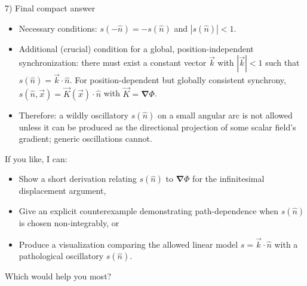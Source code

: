 \documentclass[a4paper]{article}
\theoremstyle{plain}
\theoremstyle{definition}
\newcommand{\vect}[1]{\vec{#1}}
\newcommand{\hatvec}[1]{\hat{#1}}
\newcommand{\del}{\bm{\nabla}}
\begin{document}
7) Final compact answer

\begin{itemize}
\item Necessary conditions: $s(-\hatvec{n}) = -s(\hatvec{n})$ and
  $|s(\hatvec{n})| < 1$.
\item Additional (crucial) condition for a global,
  position-independent synchronization: there must exist a constant
  vector $\vect{k}$ with $|\vect{k}| < 1$ such that
  $s(\hatvec{n}) = \vect{k} \cdot \hatvec{n}$.  For position-dependent
  but globally consistent synchrony,
  $s(\hatvec{n}, \vect{x}) = \vect{K}(\vect{x}) \cdot \hatvec{n}$
  with $\vect{K} = \del \Phi$.
\item Therefore: a wildly oscillatory $s(\hatvec{n})$ on a small
  angular arc is not allowed unless it can be produced as the
  directional projection of some scalar field's gradient; generic
  oscillations cannot.
\end{itemize}

If you like, I can:
\begin{itemize}
\item Show a short derivation relating $s(\hatvec{n})$ to $\del \Phi$
  for the infinitesimal displacement argument,
\item Give an explicit counterexample demonstrating path-dependence
  when $s(\hatvec{n})$ is chosen non-integrably, or
\item Produce a visualization comparing the allowed linear model
  $s = \vect{k} \cdot \hatvec{n}$ with a pathological oscillatory
  $s(\hatvec{n})$.
\end{itemize}

Which would help you most?
\end{document}
